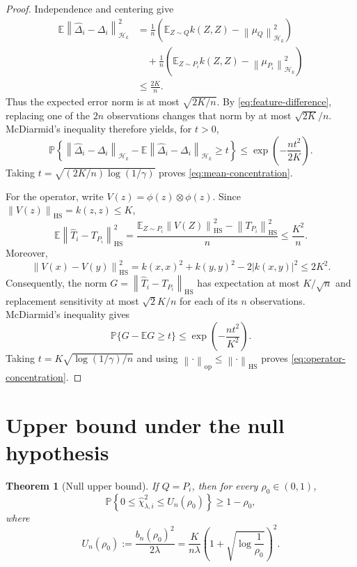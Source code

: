 \documentclass[11pt,a4paper]{article}
\newtheorem{theorem}{Theorem}
\newcommand{\HH}{\mathcal H_k}
\newcommand{\E}{\mathbb E}
\newcommand{\Prob}{\mathbb P}
\newcommand{\norm}[1]{\left\lVert #1\right\rVert}
\newcommand{\op}{\mathrm{op}}
\newcommand{\HS}{\mathrm{HS}}
\begin{document}
\begin{proof}
Independence and centering give
\begin{align*}
    \E\norm{\widehat\Delta_i-\Delta_i}_{\HH}^2
    &=
    \frac1n
    \left(
        \E_{Z\sim Q}k(Z,Z)-\norm{\mu_Q}_{\HH}^2
    \right)\\
    &\quad+
    \frac1n
    \left(
        \E_{Z\sim P_i}k(Z,Z)
        -\norm{\mu_{P_i}}_{\HH}^2
    \right)\\
    &\le\frac{2K}{n}.
\end{align*}
Thus the expected error norm is at most
$\sqrt{2K/n}$.
By \eqref{eq:feature-difference}, replacing one of
the $2n$ observations changes that norm by at most
$\sqrt{2K}/n$. McDiarmid's inequality therefore yields,
for $t>0$,
\[
    \Prob\left\{
        \norm{\widehat\Delta_i-\Delta_i}_{\HH}
        -
        \E\norm{\widehat\Delta_i-\Delta_i}_{\HH}
        \ge t
    \right\}
    \le
    \exp\left(-\frac{nt^2}{2K}\right).
\]
Taking $t=\sqrt{(2K/n)\log(1/\gamma)}$ proves
\eqref{eq:mean-concentration}.

For the operator, write $V(z)=\phi(z)\otimes\phi(z)$.
Since $\norm{V(z)}_{\HS}=k(z,z)\le K$,
\[
    \E\norm{\widehat T_i-T_{P_i}}_{\HS}^2
    =
    \frac{
        \E_{Z\sim P_i}\norm{V(Z)}_{\HS}^2
        -
        \norm{T_{P_i}}_{\HS}^2
    }{n}
    \le\frac{K^2}{n}.
\]
Moreover,
\[
    \norm{V(x)-V(y)}_{\HS}^2
    =
    k(x,x)^2+k(y,y)^2-2|k(x,y)|^2
    \le2K^2.
\]
Consequently, the norm
$G=\norm{\widehat T_i-T_{P_i}}_{\HS}$
has expectation at most $K/\sqrt n$ and replacement
sensitivity at most $\sqrt2K/n$ for each of its $n$
observations. McDiarmid's inequality gives
\[
    \Prob\{G-\E G\ge t\}
    \le
    \exp\left(-\frac{nt^2}{K^2}\right).
\]
Taking $t=K\sqrt{\log(1/\gamma)/n}$ and using
$\norm{\cdot}_{\op}\le\norm{\cdot}_{\HS}$
proves \eqref{eq:operator-concentration}.
\end{proof}

\section{Upper bound under the null hypothesis}

\begin{theorem}[Null upper bound]\label{thm:null}
If $Q=P_i$, then for every $\rho_0\in(0,1)$,
\[
    \Prob\left\{
        0\le\widehat\chi^2_{\lambda,i}
        \le U_n(\rho_0)
    \right\}
    \ge1-\rho_0,
\]
where
\begin{equation}\label{eq:U}
    \boxed{
    U_n(\rho_0)
    :=
    \frac{b_n(\rho_0)^2}{2\lambda}
    =
    \frac{K}{n\lambda}
    \left(1+\sqrt{\log\frac1{\rho_0}}\right)^2.
    }
\end{equation}
\end{theorem}
\end{document}
